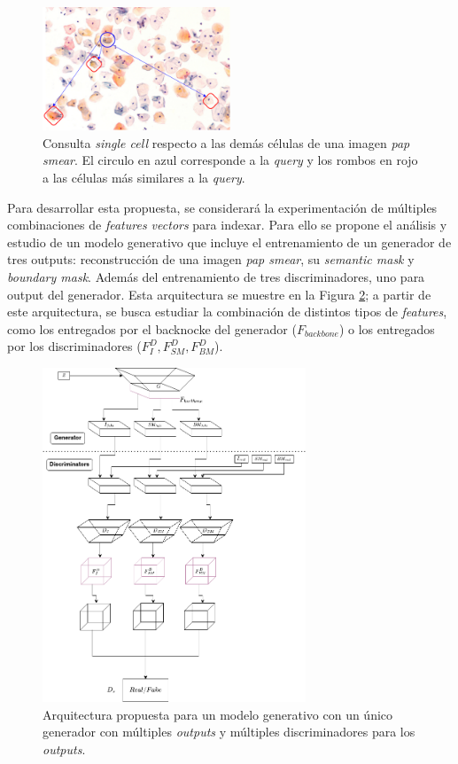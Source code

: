 \documentclass[10pt]{article}
\begin{document}
\begin{figure}
    \centering
    \includegraphics[width=0.5\textwidth]{img/multi-cell-1m.png}
    \caption{Consulta \textit{single cell} respecto a las demás células de una imagen \textit{pap smear}. El circulo en azul corresponde a la \textit{query} y los rombos en rojo a las células más similares a la \textit{query}.}
    \label{fig:mt:4a}
\end{figure}
Para desarrollar esta propuesta, se considerará la experimentación de múltiples combinaciones de \textit{features vectors} para indexar. Para ello se propone el análisis y estudio de un modelo generativo que incluye el entrenamiento de un generador de tres outputs: reconstrucción de una imagen \textit{pap smear}, su \textit{semantic mask} y \textit{boundary mask}. Además del entrenamiento de tres discriminadores, uno para output del generador. Esta arquitectura se muestre en la Figura \ref{fig:mt:5a}; a partir de este arquitectura, se busca estudiar la combinación de distintos tipos de \textit{features}, como los entregados por el backnocke del generador ($F_{backbone}$) o los entregados por los discriminadores ($F_{I}^{D},F_{SM}^{D},F_{BM}^{D}$).
\begin{figure}
    \centering
    \includegraphics[width=0.7\textwidth]{img/arq-prop.png}
    \caption{Arquitectura propuesta para un modelo generativo con un único generador con múltiples \textit{outputs} y múltiples discriminadores para los \textit{outputs}.}
    \label{fig:mt:5a}
\end{figure}
\end{document}
